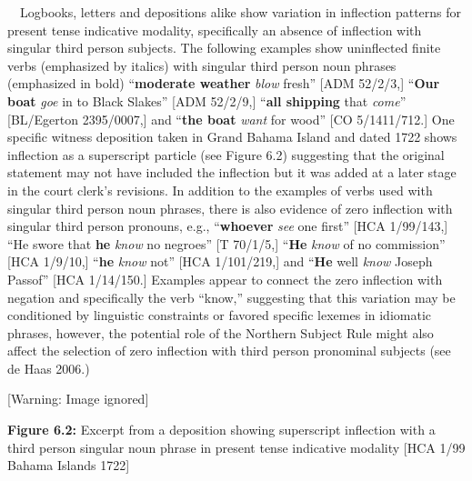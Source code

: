 \begin{styleStandard}
\ \ Logbooks, letters and depositions alike show variation in inflection patterns for present tense indicative modality, specifically an absence of inflection with singular third person subjects. The following examples show uninflected finite verbs (emphasized by italics) with singular third person noun phrases (emphasized in bold) “\textbf{moderate weather} \textit{blow} fresh” [ADM 52/2/3,] “\textbf{Our boat} \textit{goe }in to Black Slakes” [ADM 52/2/9,] “\textbf{all shipping }that \textit{come}” [BL/Egerton 2395/0007,] and “\textbf{the boat} \textit{want }for wood” [CO 5/1411/712.] One specific witness deposition taken in Grand Bahama Island and dated 1722 shows inflection as a superscript particle (see Figure 6.2) suggesting that the original statement may not have included the inflection but it was added at a later stage in the court clerk’s revisions. In addition to the examples of verbs used with singular third person noun phrases, there is also evidence of zero inflection with singular third person pronouns, e.g., “\textbf{whoever}\textit{ see} one first” [HCA 1/99/143,] “He swore that \textbf{he} \textit{know} no negroes” [T 70/1/5,] “\textbf{He} \textit{know} of no commission” [HCA 1/9/10,] “\textbf{he} \textit{know} not” [HCA 1/101/219,] and “\textbf{He} well \textit{know }Joseph Passof” [HCA 1/14/150.] Examples appear to connect the zero inflection with negation and specifically the verb “know,” suggesting that this variation may be conditioned by linguistic constraints or favored specific lexemes in idiomatic phrases, however, the potential role of the Northern Subject Rule might also affect the selection of zero inflection with third person pronominal subjects (see de Haas 2006.) 
\end{styleStandard}


\begin{center}
 [Warning: Image ignored] %

\end{center}
\begin{styleStandard}
\textbf{Figure 6.2: }Excerpt from a deposition showing superscript inflection with a third person singular noun phrase in present tense indicative modality [HCA 1/99 Bahama Islands 1722]
\end{styleStandard}


